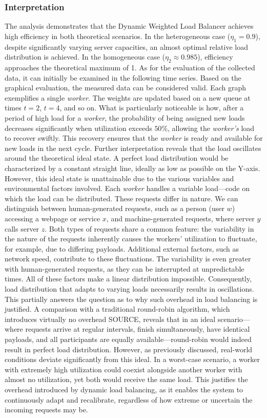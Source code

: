 \documentclass[twocolumn]{webofc}
\begin{document}
\subsubsection{Interpretation}
The analysis demonstrates that the Dynamic Weighted Load Balancer achieves high efficiency in both theoretical scenarios. In the heterogeneous case (\(\eta_1 = 0.9\)), despite significantly varying server capacities, an almost optimal relative load distribution is achieved. In the homogeneous case (\(\eta_2 \approx 0.985\)), efficiency approaches the theoretical maximum of 1. As for the evaluation of the collected data, it can initially be examined in the following time series. Based on the graphical evaluation, the measured data can be considered valid. Each graph exemplifies a single \textit{worker}. The weights are updated based on a new queue at times \(t=2\), \(t=4\), and so on. What is particularly noticeable is how, after a period of high load for a \textit{worker}, the probability of being assigned new loads decreases significantly when utilization exceeds \(50\%\), allowing the \textit{worker's} load to recover swiftly. This recovery ensures that the \textit{worker} is ready and available for new loads in the next cycle. Further interpretation reveals that the load oscillates around the theoretical ideal state. A perfect load distribution would be characterized by a constant straight line, ideally as low as possible on the Y-axis. However, this ideal state is unattainable due to the various variables and environmental factors involved. Each \textit{worker} handles a variable load—code on which the load can be distributed. These requests differ in nature. We can distinguish between human-generated requests, such as a person (user \(w\)) accessing a webpage or service \(x\), and machine-generated requests, where server \(y\) calls server \(z\). Both types of requests share a common feature: the variability in the nature of the requests inherently causes the workers' utilization to fluctuate, for example, due to differing payloads. Additional external factors, such as network speed, contribute to these fluctuations. The variability is even greater with human-generated requests, as they can be interrupted at unpredictable times. All of these factors make a linear distribution impossible. Consequently, load distribution that adapts to varying loads necessarily results in oscillations. This partially answers the question as to why such overhead in load balancing is justified. A comparison with a traditional round-robin algorithm, which introduces virtually no overhead {\color{red} SOURCE}, reveals that in an ideal scenario—where requests arrive at regular intervals, finish simultaneously, have identical payloads, and all participants are equally available—round-robin would indeed result in perfect load distribution. However, as previously discussed, real-world conditions deviate significantly from this ideal. In a worst-case scenario, a worker with extremely high utilization could coexist alongside another worker with almost no utilization, yet both would receive the same load. This justifies the overhead introduced by dynamic load balancing, as it enables the system to continuously adapt and recalibrate, regardless of how extreme or uncertain the incoming requests may be.
\end{document}
